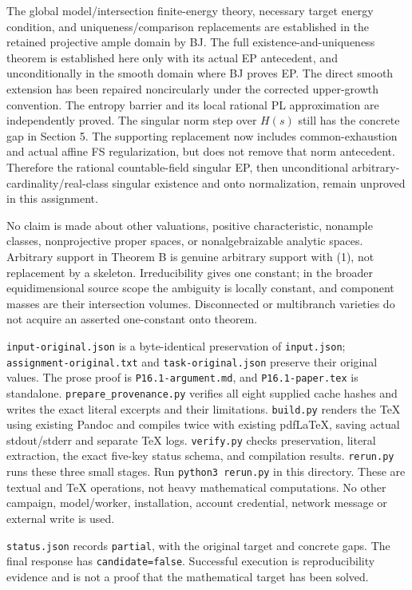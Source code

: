 \documentclass[
  11pt,
]{article}
\begin{document}
The global model/intersection finite-energy theory, necessary target
energy condition, and uniqueness/comparison replacements are established
in the retained projective ample domain by BJ. The full
existence-and-uniqueness theorem is established here only with its
actual EP antecedent, and unconditionally in the smooth domain where BJ
proves EP. The direct smooth extension has been repaired noncircularly
under the corrected upper-growth convention. The entropy barrier and its
local rational PL approximation are independently proved. The singular
norm step over \(H(s)\) still has the concrete gap in Section 5. The
supporting replacement now includes common-exhaustion and actual affine
FS regularization, but does not remove that norm antecedent. Therefore
the rational countable-field singular EP, then unconditional
arbitrary-cardinality/real-class singular existence and onto
normalization, remain unproved in this assignment.

No claim is made about other valuations, positive characteristic,
nonample classes, nonprojective proper spaces, or nonalgebraizable
analytic spaces. Arbitrary support in Theorem B is genuine arbitrary
support with (1), not replacement by a skeleton. Irreducibility gives
one constant; in the broader equidimensional source scope the ambiguity
is locally constant, and component masses are their intersection
volumes. Disconnected or multibranch varieties do not acquire an
asserted one-constant onto theorem.

\texttt{input-original.json} is a byte-identical preservation of
\texttt{input.json}; \texttt{assignment-original.txt} and
\texttt{task-original.json} preserve their original values. The prose
proof is \texttt{P16.1-argument.md}, and \texttt{P16.1-paper.tex} is
standalone. \texttt{prepare\_provenance.py} verifies all eight supplied
cache hashes and writes the exact literal excerpts and their
limitations. \texttt{build.py} renders the TeX using existing Pandoc and
compiles twice with existing pdfLaTeX, saving actual stdout/stderr and
separate TeX logs. \texttt{verify.py} checks preservation, literal
extraction, the exact five-key status schema, and compilation results.
\texttt{rerun.py} runs these three small stages. Run
\texttt{python3\ rerun.py} in this directory. These are textual and TeX
operations, not heavy mathematical computations. No other campaign,
model/worker, installation, account credential, network message or
external write is used.

\texttt{status.json} records \texttt{partial}, with the original target
and concrete gaps. The final response has \texttt{candidate=false}.
Successful execution is reproducibility evidence and is not a proof that
the mathematical target has been solved.
\end{document}
